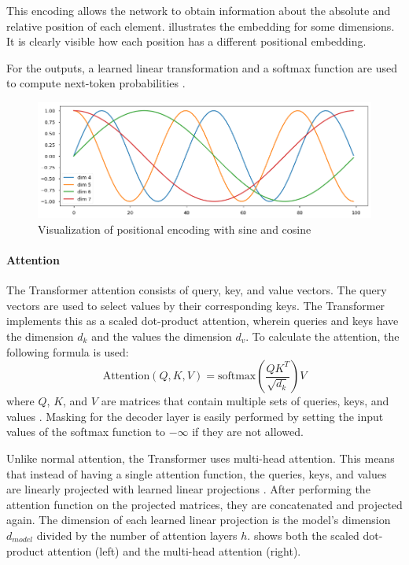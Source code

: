 This encoding allows the network to obtain information about the absolute and relative position of each element.
 illustrates the embedding for some dimensions.
It is clearly visible how each position has a different positional embedding.

For the outputs, a learned linear transformation and a softmax function are used to compute next-token probabilities \cite[p.~5]{1706.03762}.

\begin{figure}[h]
\centering
\includegraphics[width=0.7\paperwidth]{figures/positional-encoding-sine-cosine}
\caption[Visualization of positional encoding with sine and cosine]{Visualization of positional encoding with sine and cosine \cite{annotated.transformer}}
\label{fig:positional-encoding-sine-cosine}
\end{figure}

\paragraph{Attention}

The Transformer attention consists of query, key, and value vectors.
The query vectors are used to select values by their corresponding keys.
The Transformer implements this as a scaled dot-product attention, wherein queries and keys have the dimension $d_k$ and the values the dimension $d_v$.
To calculate the attention, the following formula is used:
\[
	\textrm{Attention}(Q,K,V) = \textrm{softmax}(\dfrac{QK^T}{\sqrt{d_k}})V
\]
where $Q$, $K$, and $V$ are matrices that contain multiple sets of queries, keys, and values \cite[p.~3--4]{1706.03762}.
Masking for the decoder layer is easily performed by setting the input values of the softmax function to $-\infty$ if they are not allowed.

Unlike normal attention, the Transformer uses multi-head attention.
This means that instead of having a single attention function, the queries, keys, and values are linearly projected with learned linear projections \cite[p.~4--5]{1706.03762}.
After performing the attention function on the projected matrices, they are concatenated and projected again.
The dimension of each learned linear projection is the model's dimension $d_{model}$ divided by the number of attention layers $h$.
 shows both the scaled dot-product attention (left) and the multi-head attention (right).

